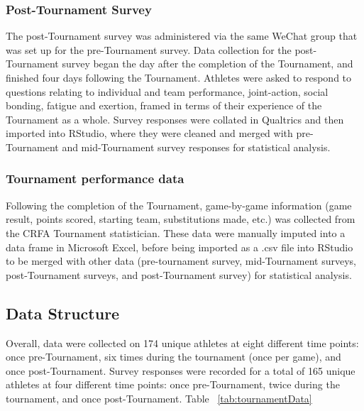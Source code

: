 \documentclass[12pt]{report}
\begin{document}
        \subsubsection{Post-Tournament Survey}

The post-Tournament survey was administered via the same WeChat group that was set up for the pre-Tournament survey. Data collection for the post-Tournament survey began the day after the completion of the Tournament, and finished four days following the Tournament. Athletes were asked to respond to questions relating to individual and team performance, joint-action, social bonding, fatigue and exertion, framed in terms of their experience of the Tournament as a whole. Survey responses were collated in Qualtrics and then imported into RStudio, where they were cleaned and merged with pre-Tournament and mid-Tournament survey responses for statistical analysis.


        \subsubsection{Tournament performance data}
Following the completion of the Tournament, game-by-game information (game result, points scored, starting team, substitutions made, etc.) was collected from the CRFA Tournament statistician. These data were manually imputed into a data frame in Microsoft Excel, before being imported as a .csv file into RStudio to be merged with other data (pre-tournament survey, mid-Tournament surveys, post-Tournament surveys, and post-Tournament survey) for statistical analysis.


\subsection{Data Structure}
Overall, data were collected on 174 unique athletes at eight different time points: once pre-Tournament, six times during the tournament (once per game), and once post-Tournament. Survey responses were recorded for a total of 165 unique athletes at four different time points: once pre-Tournament, twice during the tournament, and once post-Tournament. Table ~\ref{tab:tournamentData}
\end{document}
